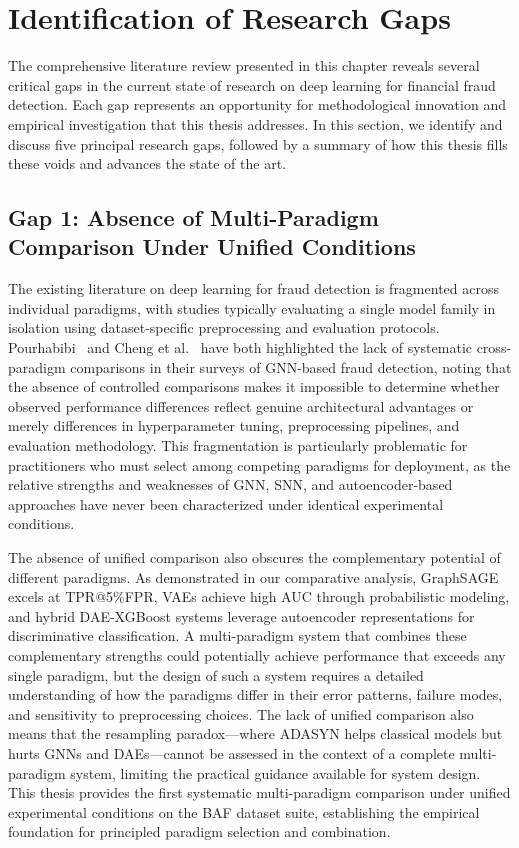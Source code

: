 \section{Identification of Research Gaps}

The comprehensive literature review presented in this chapter reveals several
critical gaps in the current state of research on deep learning for financial
fraud detection. Each gap represents an opportunity for methodological
innovation and empirical investigation that this thesis addresses. In this
section, we identify and discuss five principal research gaps, followed by a
summary of how this thesis fills these voids and advances the state of the art.

\subsection{Gap 1: Absence of Multi-Paradigm Comparison Under Unified Conditions}

The existing literature on deep learning for fraud detection is fragmented
across individual paradigms, with studies typically evaluating a single model
family in isolation using dataset-specific preprocessing and evaluation
protocols. Pourhabibi~\cite{pourhabibi2022graph} and Cheng et
al.~\cite{cheng2024graph} have both highlighted the lack of systematic cross-
paradigm comparisons in their surveys of GNN-based fraud detection, noting that
the absence of controlled comparisons makes it impossible to determine whether
observed performance differences reflect genuine architectural advantages or
merely differences in hyperparameter tuning, preprocessing pipelines, and
evaluation methodology. This fragmentation is particularly problematic for
practitioners who must select among competing paradigms for deployment, as the
relative strengths and weaknesses of GNN, SNN, and autoencoder-based approaches
have never been characterized under identical experimental conditions.

The absence of unified comparison also obscures the complementary potential of
different paradigms. As demonstrated in our comparative analysis, GraphSAGE
excels at TPR@5\%FPR, VAEs achieve high AUC through probabilistic modeling, and
hybrid DAE-XGBoost systems leverage autoencoder representations for
discriminative classification. A multi-paradigm system that combines these
complementary strengths could potentially achieve performance that exceeds any
single paradigm, but the design of such a system requires a detailed
understanding of how the paradigms differ in their error patterns, failure
modes, and sensitivity to preprocessing choices. The lack of unified comparison
also means that the resampling paradox---where ADASYN helps classical models but
hurts GNNs and DAEs---cannot be assessed in the context of a complete multi-
paradigm system, limiting the practical guidance available for system design.
This thesis provides the first systematic multi-paradigm comparison under
unified experimental conditions on the BAF dataset suite, establishing the
empirical foundation for principled paradigm selection and combination.

